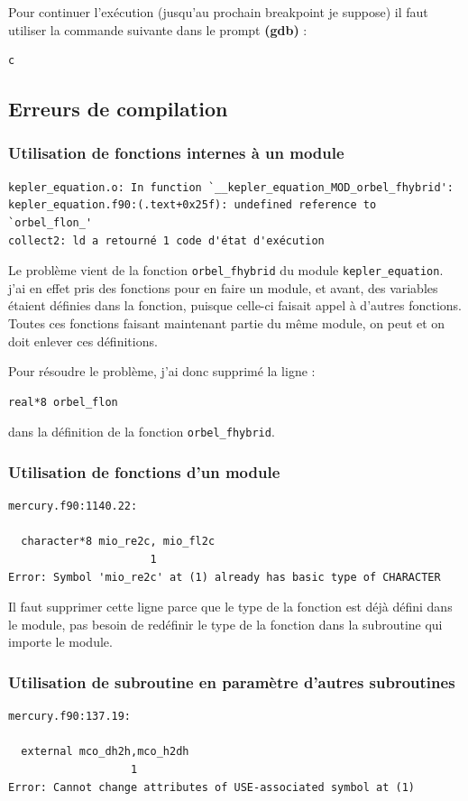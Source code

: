 \documentclass[a4paper,twoside]{article}
\begin{document}
\bigskip

Pour continuer l'exécution (jusqu'au prochain breakpoint je suppose) il faut utiliser la commande suivante dans le prompt \textbf{(gdb)} :
\begin{verbatim}
c
\end{verbatim}



\subsection{Erreurs de compilation}
\subsubsection{Utilisation de fonctions internes à un module}
\begin{verbatim}
kepler_equation.o: In function `__kepler_equation_MOD_orbel_fhybrid':
kepler_equation.f90:(.text+0x25f): undefined reference to `orbel_flon_'
collect2: ld a retourné 1 code d'état d'exécution
\end{verbatim}

Le problème vient de la fonction \verb|orbel_fhybrid| du module \verb|kepler_equation|. j'ai en effet pris des fonctions pour en faire un module, et avant, des variables étaient définies dans la fonction, puisque celle-ci faisait appel à d'autres fonctions. Toutes ces fonctions faisant maintenant partie du même module, on peut et on doit enlever ces définitions. 

Pour résoudre le problème, j'ai donc supprimé la ligne : 
\begin{verbatim}
real*8 orbel_flon
\end{verbatim}
dans la définition de la fonction \verb|orbel_fhybrid|.

\subsubsection{Utilisation de fonctions d'un module}
\begin{verbatim}
mercury.f90:1140.22:

  character*8 mio_re2c, mio_fl2c
                      1
Error: Symbol 'mio_re2c' at (1) already has basic type of CHARACTER
\end{verbatim}
Il faut supprimer cette ligne parce que le type de la fonction est déjà défini dans le module, pas besoin de redéfinir le type de la fonction dans la subroutine qui importe le module.

\subsubsection{Utilisation de subroutine en paramètre d'autres subroutines}
\begin{verbatim}
mercury.f90:137.19:

  external mco_dh2h,mco_h2dh
                   1
Error: Cannot change attributes of USE-associated symbol at (1)
\end{verbatim}
\end{document}
